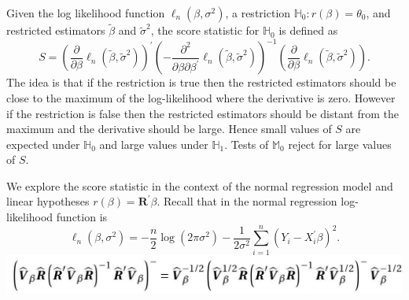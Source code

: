 \documentclass[10pt]{article}
\begin{document}
Given the log likelihood function $\ell_{n}\left(\beta, \sigma^{2}\right)$, a restriction $\mathbb{H}_{0}: r(\beta)=\theta_{0}$, and restricted estimators $\widetilde{\beta}$ and $\widetilde{\sigma}^{2}$, the score statistic for $\mathbb{H}_{0}$ is defined as
$$
S=\left(\frac{\partial}{\partial \beta} \ell_{n}\left(\widetilde{\beta}, \widetilde{\sigma}^{2}\right)\right)^{\prime}\left(-\frac{\partial^{2}}{\partial \beta \partial \beta^{\prime}} \ell_{n}\left(\widetilde{\beta}, \widetilde{\sigma}^{2}\right)\right)^{-1}\left(\frac{\partial}{\partial \beta} \ell_{n}\left(\widetilde{\beta}, \widetilde{\sigma}^{2}\right)\right) .
$$
The idea is that if the restriction is true then the restricted estimators should be close to the maximum of the log-likelihood where the derivative is zero. However if the restriction is false then the restricted estimators should be distant from the maximum and the derivative should be large. Hence small values of $S$ are expected under $\mathbb{H}_{0}$ and large values under $\mathbb{H}_{1}$. Tests of $\mathbb{M}_{0}$ reject for large values of $S$.

We explore the score statistic in the context of the normal regression model and linear hypotheses $r(\beta)=\boldsymbol{R}^{\prime} \beta$. Recall that in the normal regression log-likelihood function is
$$
\ell_{n}\left(\beta, \sigma^{2}\right)=-\frac{n}{2} \log \left(2 \pi \sigma^{2}\right)-\frac{1}{2 \sigma^{2}} \sum_{i=1}^{n}\left(Y_{i}-X_{i}^{\prime} \beta\right)^{2} .
$$
\includegraphics[max width=\textwidth]{2022_09_17_d22774979aa7978900adg-16}
\end{document}

